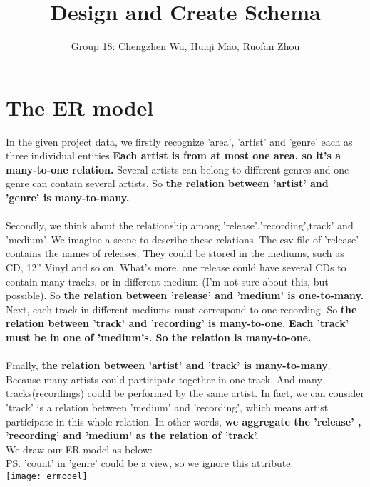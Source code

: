 \documentclass[11pt]{article} %
\title{Design and Create Schema}
\author{Group 18: Chengzhen Wu, Huiqi Mao, Ruofan Zhou}
\begin{document}
\maketitle

\section{The ER model}
In the given project data, we firstly recognize 'area', 'artist' and 'genre' each as three individual entities \textbf{Each artist is from at most one area, so it's a many-to-one relation.} Several artists can belong to different genres and one genre can contain several artists. So \textbf{the relation between 'artist' and 'genre' is many-to-many. }\\ \\
Secondly, we  think about the relationship among 'release','recording',track' and 'medium'. We imagine a scene to describe these relations. The csv file of 'release' contains the names of releases. They could be stored in the mediums, such as CD, 12'' Vinyl and so on. What's more, one release could have several CDs to contain many tracks, or in different medium (I'm not sure about this, but possible).  So \textbf{the relation between 'release' and 'medium' is one-to-many.} Next, each track in different mediums must correspond to one recording. So \textbf{the relation between 'track' and 'recording' is many-to-one.}  \textbf{Each 'track' must be in one of  'medium's. So the relation is many-to-one.}  \\ \\
Finally, \textbf{the relation between 'artist' and 'track' is many-to-many}. Because many artists could participate together in one track. And many tracks(recordings) could be performed by the same artist. In fact, we can consider 'track' is a relation between 'medium' and 'recording', which means artist participate in this whole relation. In other words, \textbf{we aggregate the 'release' , 'recording' and 'medium' as the relation of 'track'.} \\



We draw our ER model as below: \\

PS. 'count' in 'genre' could be a view, so we ignore this attribute. \\
\texttt{[image: ermodel]}
\end{document}
